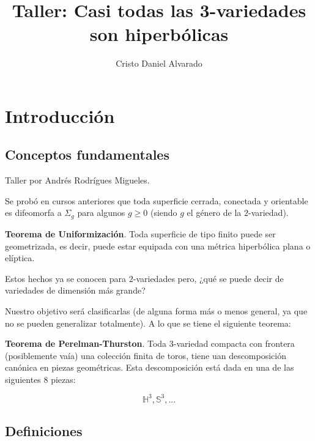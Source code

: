 \documentclass[12pt]{report}
\theoremstyle{largebreak}
\begin{document}
    \setlength{\parskip}{5pt} %
    \setlength{\parindent}{12pt} %
    \title{Taller: Casi todas las 3-variedades son hiperbólicas}
    \author{Cristo Daniel Alvarado}
    \maketitle

    \tableofcontents %

    
    \chapter{Introducción}
    
    \section{Conceptos fundamentales}

    Taller por Andrés Rodrígues Migueles.

    Se probó en cursos anteriores que toda superficie cerrada, conectada y orientable es difeomorfa a $\Sigma_g$ para algunos $g\geq0$ (siendo $g$ el género de la $2$-variedad).

    \textbf{Teorema de Uniformización}. Toda superficie de tipo finito puede ser geometrizada, es decir, puede estar equipada con una métrica hiperbólica plana o elíptica.

    Estos hechos ya se conocen para $2$-variedades pero, ¿qué se puede decir de variedades de dimensión más grande?

    Nuestro objetivo será clasificarlas (de alguna forma más o menos general, ya que no se pueden generalizar totalmente). A lo que se tiene el siguiente teorema:

    \textbf{Teorema de Perelman-Thurston}. Toda 3-variedad compacta con frontera (posiblemente vaía) una colección finita de toros, tiene uan descomposición canónica en piezas geométricas. Esta descomposición está dada en una de las siguientes 8 piezas:

    \begin{equation*}
        \mathbb{H}^3,\mathbb{S}^3,...
    \end{equation*}

    \section{Definiciones}
\end{document}
